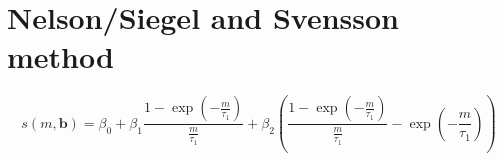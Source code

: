 
\section{Nelson/Siegel and Svensson method}
\label{sec:nels-svenss-meth}


\begin{equation}
  \label{eq:nelsonspot}
   s(m,\bm{b}) = \beta_0 + \beta_1\frac{1-\exp(-\frac{m}{\tau_1})}{\frac{m}{\tau_1}} + \beta_2\left(\frac{1-\exp(-\frac{m}{\tau_1})}{\frac{m}{\tau_1}} - \exp(-\frac{m}{\tau_1})\right)
\end{equation}


